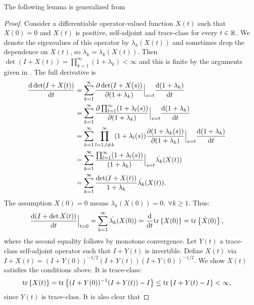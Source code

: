 The following lemma is generalized from \cite[Chapter 9, Theorem 4,
p. 127]{Lax07}
\lax*
\begin{proof}
  Consider a differentiable operator-valued function $X(t)$ such that
  $X(0) = 0$ and $X(t)$ is positive, self-adjoint and trace-class for
  every $t\in \mathbb{R}$. We denote the eigenvalues of this operator by
  $\lambda_k(X(t))$ and sometimes drop the dependence on $X(t)$, so
  $\lambda_k = \lambda_k(X(t))$.  Then $\det (I+X(t))
  = \prod_{k=1}^{\infty} (1+\lambda_k) < \infty$ and this is finite by
  the arguments given in \cite{AlexanderianGloorGhattas14}. The full
  derivative is \begin{align*} \frac{\text{\textup{d}} \det (I+X(t))}{\text{\textup{d}} t}
    &= \sum_{k=1}^{\infty} 
    \frac{\partial \det (I+X(s))}{\partial (1+\lambda_k)}\Big |_{s=t}
    \frac{\text{\textup{d}} (1+\lambda_k)}{\text{\textup{d}} t} \\
    &= \sum_{k=1}^{\infty} \frac{\partial \prod_{l=1}^{\infty}
      (1+\lambda_l(s))}{\partial (1+\lambda_k)}\Big |_{s=t}
    \frac{\text{\textup{d}} (1+\lambda_k)}{\text{\textup{d}} t} \\
    &= \sum_{k=1}^{\infty} \prod_{l=1, l\neq k}^{\infty}
      (1+\lambda_l(s)) \frac{\partial (1+\lambda_k(s))}{\partial (1+\lambda_k)}\Big |_{s=t}
    \frac{\text{\textup{d}} (1+\lambda_k)}{\text{\textup{d}} t} \\
    &= \sum_{k=1}^{\infty} \frac{\prod_{l=1}^{\infty}
      (1+\lambda_l(s))}{(1+\lambda_k)}\Big |_{s=t}
    \dot{\lambda_k}(X(t)) \\
    &= \sum_{k=1}^{\infty} \frac{\det (I+X(t))}{1 +\lambda_k} \dot{\lambda_k}(X(t)).
  \end{align*}
  The assumption $X(0) = 0$ means $\lambda_k(X(0)) = 0,\ \forall k \geq 1$. Thus:
  \begin{align*}
    \frac{\text{\textup{d}} (I+\det X(t))}{\text{\textup{d}} t}\Big |_{t=0} 
    = \sum_{k=1}^{\infty} \dot{\lambda_k}(X(0)) 
    = \frac{\text{\textup{d}} }{\text{\textup{d}} t}\textup{tr}\left \{X(0) \right \}
    = \textup{tr}\left \{\dot{X}(0) \right \},
  \end{align*}
  where the second equality follows by monotone convergence. 
  Let $Y(t)$ a trace-class self-adjoint operator such that 
  $I+Y(t)$ is invertible.
  Define $X(t)$ via $I+X(t) = (I+Y(0))^{-1/2} (I+Y(t)) (I+Y(0))^{-1/2}$. 
  We show $X(t)$ satisfies the conditions above. It is trace-class:
  \begin{align*}
    \textup{tr}\left \{X(t) \right \} = \textup{tr}\left \{(I+Y(0))^{-1} (I+Y(t)) - I \right \}
    \leq \textup{tr}\left \{I+Y(t) - I \right \}< \infty,
  \end{align*}
  since $Y(t)$ is trace-class. It is also clear that

\end{proof}

